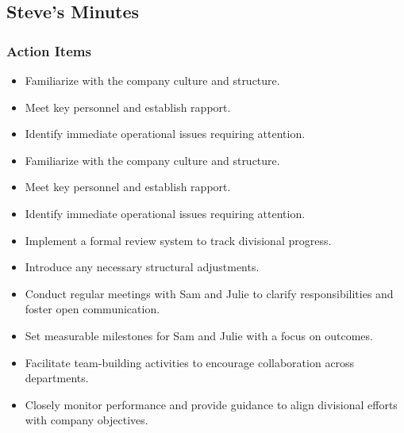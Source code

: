 \documentclass[a4paper,12pt]{article}
\begin{document}
\subsection{Steve's Minutes}
\author{Bahne Thiel-Peters (Julie)}

\subsubsection{Action Items}

\begin{itemize}
    \item Familiarize with the company culture and structure.
    \item Meet key personnel and establish rapport.
    \item Identify immediate operational issues requiring attention.
\end{itemize}

\begin{itemize}
    \item Familiarize with the company culture and structure.
    \item Meet key personnel and establish rapport.
    \item Identify immediate operational issues requiring attention.
\end{itemize}

\begin{itemize}
    \item Implement a formal review system to track divisional progress.
    \item Introduce any necessary structural adjustments.
    \item Conduct regular meetings with Sam and Julie to clarify responsibilities and foster open communication.
\end{itemize}

\begin{itemize}
    \item Set measurable milestones for Sam and Julie with a focus on outcomes.
    \item Facilitate team-building activities to encourage collaboration across departments.
    \item Closely monitor performance and provide guidance to align divisional efforts with company objectives.
\end{itemize}
\end{document}
